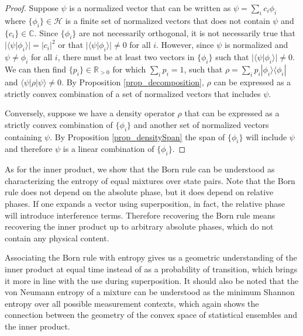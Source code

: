 \documentclass[10pt,twocolumn, nofootinbib]{revtex4-2}
\def\>{\rangle}
\def\<{\langle}
\begin{document}
\begin{proof}
Suppose $\psi$ is a normalized vector that can be written as $\psi = \sum_{i} c_i \phi_i$ where $\{\phi_i\} \in \mathcal{H}$ is a finite set of normalized vectors that does not contain $\psi$ and $\{c_i\} \in \mathbb{C}$. Since $\{\phi_i\}$ are not necessarily orthogonal, it is not necessarily true that $|\<\psi|\phi_i\>| = |c_i|^2$ or that $|\<\psi|\phi_i\>| \neq 0$ for all $i$. However, since $\psi$ is normalized and $\psi \neq \phi_i$ for all $i$, there must be at least two vectors in $\{\phi_i\}$ such that $|\<\psi|\phi_i\>| \neq 0$. We can then find $\{p_i\} \in \mathbb{R}_{>0}$ for which $\sum_i p_i =1$, such that $\rho = \sum_i p_i |\phi_i\>\<\phi_i|$ and $\<\psi|\rho|\psi\> \neq 0$. By Proposition \ref{prop_decomposition}, $\rho$ can be expressed as a strictly convex combination of a set of normalized vectors that includes $\psi$.

Conversely, suppose we have a density operator $\rho$ that can be expressed as a strictly convex combination of $\{\phi_i\}$ and another set of normalized vectors containing $\psi$. By Proposition \ref{prop_densitySpan} the span of $\{\phi_i\}$ will include $\psi$ and therefore $\psi$ is a linear combination of $\{\phi_i\}$.
\end{proof}

As for the inner product, we show that the Born rule can be understood as characterizing the entropy of equal mixtures over state pairs. Note that the Born rule does not depend on the absolute phase, but it does depend on relative phases. If one expands a vector using superposition, in fact, the relative phase will introduce interference terms. Therefore recovering the Born rule means recovering the inner product up to arbitrary absolute phases, which do not contain any physical content.

Associating the Born rule with entropy gives us a geometric understanding of the inner product at equal time instead of as a probability of transition, which brings it more in line with the use during superposition. It should also be noted that the von Neumann entropy of a mixture can be understood as the minimum Shannon entropy over all possible measurement contexts,\cite{nielsen_chuang_2010} which again shows the connection between the geometry of the convex space of statistical ensembles and the inner product.
\end{document}
